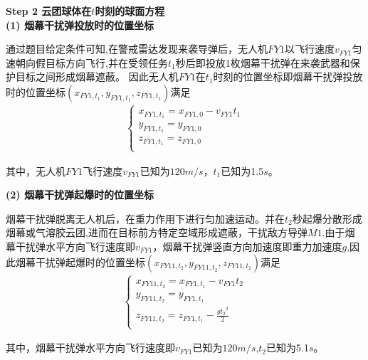 \documentclass[../main.tex]{subfiles}
\begin{document}
\noindent\textbf{Step 2 云团球体在$t$时刻的球面方程}
\\
\noindent \textbf{(1) 烟幕干扰弹投放时的位置坐标}
\par 通过题目给定条件可知,在警戒雷达发现来袭导弹后，无人机\( FY1 \)以飞行速度\( v_{FY1} \)匀速朝向假目标方向飞行,并在受领任务$t_1$秒后即投放1枚烟幕干扰弹在来袭武器和保护目标之间形成烟幕遮蔽。
因此无人机$FY1$在$t_1$时刻的位置坐标即烟幕干扰弹投放时的位置坐标$(x_{FY1,t_1}, y_{FY1,{t_1}}, z_{FY1,{t_1}})$满足
\begin{align}\label{1.8}
\left\{ \begin{array}{l}
x_{FY1,{t_1}}=x_{FY1,0}-v_{FY1}{t_1}\\
y_{FY1,{t_1}}=y_{FY1,0}\\
z_{FY1,{t_1}}=z_{FY1,0}\\
\end{array} \right. 
\end{align}
\par 其中，无人机$FY1$飞行速度\( v_{FY1} \)已知为$120m/s$，$t_1$已知为1.5$s$。


\noindent\textbf{(2) 烟幕干扰弹起爆时的位置坐标}
\par 烟幕干扰弹脱离无人机后，在重力作用下进行匀加速运动。并在$t_2$秒起爆分散形成烟幕或气溶胶云团,进而在目标前方特定空域形成遮蔽，干扰敌方导弹$M1$.由于烟幕干扰弹水平方向飞行速度即\( v_{FY1} \)，烟幕干扰弹竖直方向加速度即重力加速度$g$,因此烟幕干扰弹起爆时的位置坐标$\left( x_{FY11,t_2},y_{FY11,t_2},z_{FY11,t_2} \right)$满足
\begin{align}\label{1.9}
\left\{ \begin{array}{l}
	x_{FY11,{t_2}}=x_{FY1,t_1}-v_{FY1}{t_2} \\
	y_{FY11,{t_2}}=y_{FY1,t_1}\\
	z_{FY11,{t_2}}=z_{FY1,t_1}-\frac{g{t_2}^2}{2}\\
\end{array} \right. 
\end{align}
\par 其中，烟幕干扰弹水平方向飞行速度即\( v_{FY1} \)已知为$120m/s$,$t_2$已知为5.1$s$。
\end{document}
